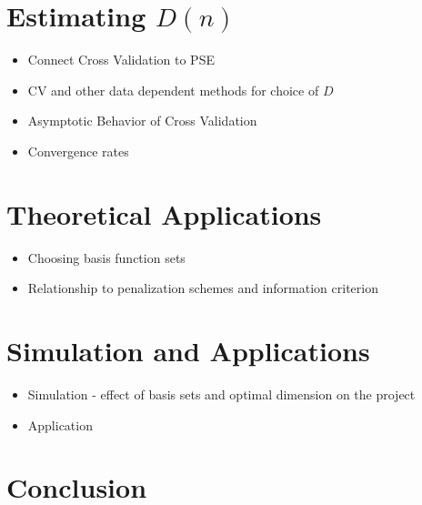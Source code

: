 \documentclass[12pt]{article}  %
\begin{document}
\section{Estimating $D(n)$}

\begin{itemize}
\item Connect Cross Validation to PSE 
\item CV and other data dependent methods for choice of $D$
\item Asymptotic Behavior of Cross Validation 
\item Convergence rates
\end{itemize}

\section{Theoretical Applications}
\begin{itemize}
\item Choosing basis function sets 
\item Relationship to penalization schemes and information criterion
\end{itemize}

\section{Simulation and Applications}

\begin{itemize}
\item Simulation - effect of basis sets and optimal dimension on the project 
\item Application 
\end{itemize}


\section{Conclusion}
\end{document}
